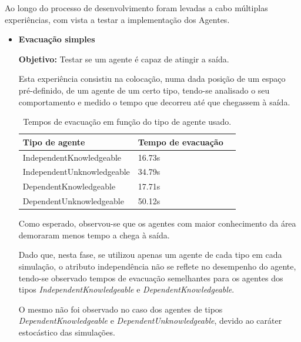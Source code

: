 \documentclass[12pt]{article}
\begin{document}
\begin{titlepage}
Ao longo do processo de desenvolvimento foram levadas a cabo múltiplas experiências, com vista a testar a implementação dos Agentes.
\begin{itemize}
	
	
\item \textbf{Evacuação simples}

\textbf{Objetivo:} 
                                                                                                                                  	Testar se um agente é capaz de atingir a saída.
	
Esta experiência consistiu na colocação, numa dada posição de um espaço pré-definido, de um agente de um certo tipo, tendo-se analisado o seu comportamento e medido o tempo que decorreu até que chegassem à saída.
	
\setlength{\tabcolsep}{20pt}
\renewcommand{\arraystretch}{1.3}
\begin{table}[H]
	\centering
	\caption{Tempos de evacuação em função do tipo de agente usado.}
	\begin{tabular}{@{}lll@{}}
		\toprule
		\rowcolor[HTML]{FFFFFF} 
		\textbf{Tipo de agente}  & \textbf{Tempo de evacuação}\\
		\toprule
		\rowcolor[HTML]{FFFFFF} 
		IndependentKnowledgeable & 16.73s \\ \midrule 
		\rowcolor[HTML]{FFFFFF} 
		IndependentUnknowledgeable & 34.79s \\ \midrule 
		DependentKnowledgeable & 17.71s \\ \midrule 
		DependentUnknowledgeable &
		50.12s \\ \midrule 
	\end{tabular}
\end{table}
	
	Como esperado, observou-se que os agentes com maior conhecimento da área demoraram menos tempo a chega à saída.
	
	Dado que, nesta fase, se utilizou apenas um agente de cada tipo em cada simulação, o atributo independência não se reflete no desempenho do agente, tendo-se observado tempos de evacuação semelhantes para os agentes dos tipos \textit{IndependentKnowledgeable} e \textit{DependentKnowledgeable}. 
	
	O mesmo não foi observado no caso dos agentes de tipos \textit{DependentKnowledgeable} e \textit{DependentUnknowledgeable}, devido ao caráter estocástico das simulações.


\end{itemize}
\end{titlepage}
\end{document}
